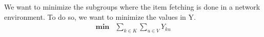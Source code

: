 We want to minimize the subgroups where the item fetching is done in a network environment. To do so, we want to minimize the values in Y. \\

\begin{align*}
    \mathbf{min} &\sum_{k\in K} \sum_{u \in V} {Y_{ku}} \\
\end{align*}